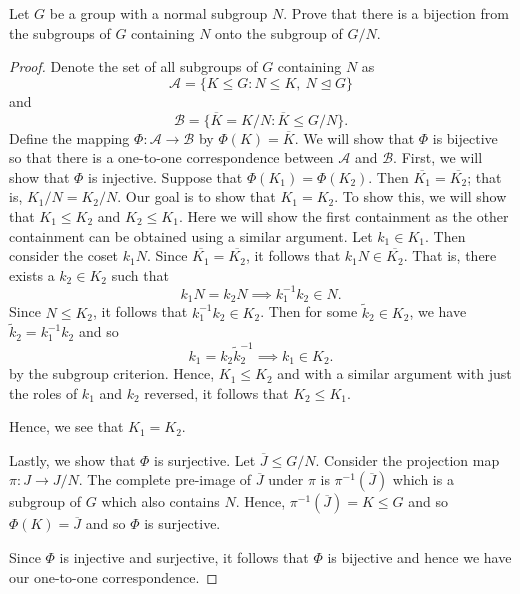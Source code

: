\documentclass[a4paper]{article}
\begin{document}
\begin{problem}
    Let \( G  \) be a group with a normal subgroup \( N  \). Prove that there is a bijection from the subgroups of \( G  \) containing \( N \) onto the subgroup of \( G / N  \).
\end{problem}
\begin{proof}
Denote the set of all subgroups of \( G  \) containing \( N  \) as 
\[  \mathcal{A} = \{  K \leq G : N \leq K, \ N \trianglelefteq G   \}  \]
and
\[  \mathcal{B} = \{ \overline{K} = K / N :   \overline{K} \leq G / N  \}.  \]
Define the mapping \( \Phi : \mathcal{A} \to \mathcal{B} \) by \( \Phi(K) = \overline{K} \). We will show that \( \Phi  \) is bijective so that there is a one-to-one correspondence between \( \mathcal{A} \) and \( \mathcal{B} \). First, we will show that \( \Phi  \) is injective. Suppose that \( \Phi({K}_{1}) = \Phi({K}_{2}) \). Then \( \overline{{K}_{1}} = \overline{{K}_{2}} \); that is, \( {K}_{1} / N = {K}_{2} / N \). Our goal is to show that \( {K}_{1} = {K}_{2} \). 
To show this, we will show that \( {K}_{1} \leq {K}_{2} \) and \( {K}_{2} \leq {K}_{1} \). Here we will show the first containment as the other containment can be obtained using a similar argument. Let \( {k}_{1} \in {K}_{1} \). Then consider the coset \( {k}_{1} N   \). Since \( \overline{{K}_{1}} = \overline{{K}_{2}} \), it follows that \( {k}_{1} N \in \overline{{K}_{2}} \). That is, there exists a \( {k}_{2} \in {K}_{2} \) such that 
\[  {k}_{1} N = {k}_{2} N \implies {k}_{1}^{-1} {k}_{2} \in N.   \]
Since \( N \leq {K}_{2} \), it follows that \( {k}_{1}^{-1} {k}_{2} \in {K}_{2} \). Then for some \( {\tilde{k}}_{2} \in {K}_{2} \), we have \( {\tilde{k}}_{2} = {k}_{1}^{-1} {k}_{2}   \) and so 
\[  {k}_{1} = {k}_{2} {\tilde{k}}_{2}^{-1} \implies {k}_{1} \in {K}_{2}.   \]
by the subgroup criterion. Hence, \( {K}_{1} \leq {K}_{2} \) and with a similar argument with just the roles of \( {k}_{1} \) and \( {k}_{2} \) reversed, it follows that \( {K}_{2} \leq {K}_{1} \).

Hence, we see that \( {K}_{1} = {K}_{2} \).

Lastly, we show that \( \Phi \) is surjective. Let \( \overline{J} \leq G / N   \). Consider the projection map \( \pi : J \to J / N  \). The complete pre-image of \( \overline{J}  \) under \( \pi \) is \( \pi^{-1}(\overline{J}) \) which is a subgroup of \( G  \) which also contains \( N  \). Hence, \( \pi^{-1}(\overline{J}) = K \leq G   \) and so \( \Phi(K) = \overline{J} \) and so \( \Phi  \) is surjective.   

Since \( \Phi  \) is injective and surjective, it follows that \( \Phi  \) is bijective and hence we have our one-to-one correspondence.
\end{proof}
\end{document}
